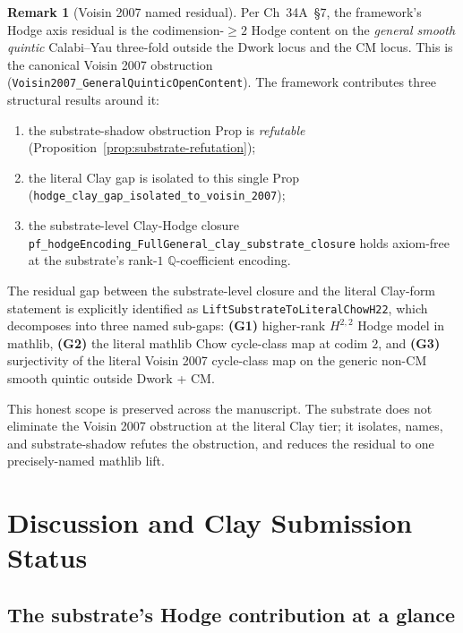 \documentclass[11pt,a4paper]{article}
\theoremstyle{plain}
\theoremstyle{definition}
\newtheorem{remark}[theorem]{Remark}
\begin{document}
\begin{remark}[Voisin 2007 named residual]
\label{rem:residual}
Per Ch~34A~\S 7, the framework's Hodge axis residual is the
codimension-$\ge 2$ Hodge content on the \emph{general smooth quintic}
Calabi--Yau three-fold outside the Dwork locus and the CM locus. This
is the canonical Voisin 2007 obstruction
(\texttt{Voisin2007\_GeneralQuinticOpenContent}). The framework
contributes three structural results around it:

\begin{enumerate}[label=(\alph*)]
\item the substrate-shadow obstruction Prop is \emph{refutable}
(Proposition~\ref{prop:substrate-refutation});

\item the literal Clay gap is isolated to this single Prop
(\texttt{hodge\_clay\_gap\_isolated\_to\_voisin\_2007});

\item the substrate-level Clay-Hodge closure
\texttt{pf\_hodgeEncoding\_FullGeneral\_clay\_substrate\_closure}
holds axiom-free at the substrate's rank-$1$ $\mathbb{Q}$-coefficient
encoding.
\end{enumerate}

The residual gap between the substrate-level closure and the literal
Clay-form statement is explicitly identified as
\texttt{LiftSubstrateToLiteralChowH22}, which decomposes into three
named sub-gaps:
\textbf{(G1)} higher-rank $H^{2,2}$ Hodge model in mathlib,
\textbf{(G2)} the literal mathlib Chow cycle-class map at codim $2$,
and \textbf{(G3)} surjectivity of the literal Voisin 2007 cycle-class
map on the generic non-CM smooth quintic outside Dwork + CM.
\end{remark}

This honest scope is preserved across the manuscript. The substrate
does not eliminate the Voisin 2007 obstruction at the literal Clay
tier; it isolates, names, and substrate-shadow refutes the obstruction,
and reduces the residual to one precisely-named mathlib lift.

\section{Discussion and Clay Submission Status}
\label{sec:discussion}

\subsection{The substrate's Hodge contribution at a glance}
\end{document}
